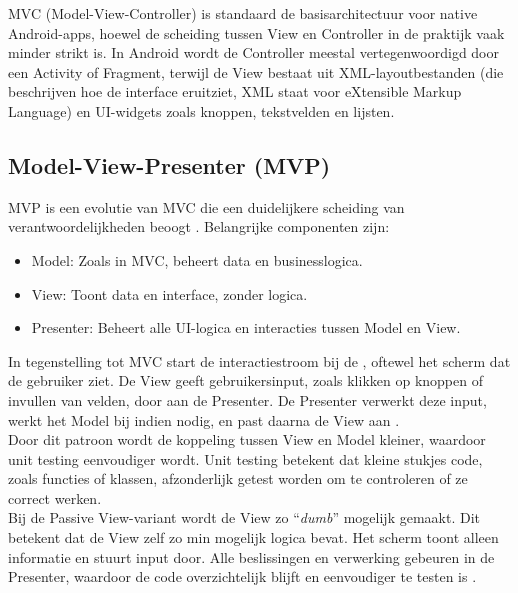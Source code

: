 MVC (Model-View-Controller) is standaard de basisarchitectuur voor native Android-apps, hoewel de scheiding tussen View en Controller in de praktijk vaak minder strikt is. In Android wordt de Controller meestal vertegenwoordigd door een Activity of Fragment, terwijl de View bestaat uit XML-layoutbestanden (die beschrijven hoe de interface eruitziet, XML staat voor eXtensible Markup Language) en UI-widgets zoals knoppen, tekstvelden en lijsten.\\

\subsection{Model-View-Presenter (MVP)}
MVP is een evolutie van MVC die een duidelijkere scheiding van verantwoordelijkheden beoogt \autocite{Lou2016}.  
Belangrijke componenten zijn:  
\begin{itemize}
	\item Model: Zoals in MVC, beheert data en businesslogica.  
	\item View: Toont data en interface, zonder logica.  
	\item Presenter: Beheert alle UI-logica en interacties tussen Model en View.  
\end{itemize}

In tegenstelling tot MVC start de interactiestroom bij de \View, oftewel het scherm dat de gebruiker ziet. De View geeft gebruikersinput, zoals klikken op knoppen of invullen van velden, door aan de Presenter. De Presenter verwerkt deze input, werkt het Model bij indien nodig, en past daarna de View aan \autocite{Lou2016}.\\

Door dit patroon wordt de koppeling tussen View en Model kleiner, waardoor unit testing eenvoudiger wordt. Unit testing betekent dat kleine stukjes code, zoals functies of klassen, afzonderlijk getest worden om te controleren of ze correct werken.\\

Bij de Passive View-variant wordt de View zo “\textit{dumb}” mogelijk gemaakt. Dit betekent dat de View zelf zo min mogelijk logica bevat. Het scherm toont alleen informatie en stuurt input door. Alle beslissingen en verwerking gebeuren in de Presenter, waardoor de code overzichtelijk blijft en eenvoudiger te testen is \textcite{Lou2016}.\\


